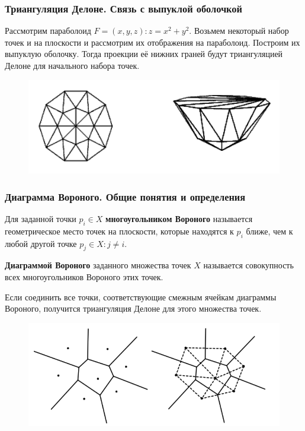 \documentclass[notheorems,aspectratio=169]{beamer}
\begin{document}
\begin{frame}\frametitle{Триангуляция Делоне. Связь с выпуклой оболочкой}
	Рассмотрим параболоид $F = {(x,y,z): z = x^2+y^2}$. Возьмем некоторый набор
	точек и на плоскости и рассмотрим их отображения на параболоид. 
	Построим их выпуклую оболочку. Тогда проекции её нижних граней будут триангуляцией Делоне
	для начального набора точек. 
	\begin{figure}
		\includegraphics[height=0.5\textheight, keepaspectratio]{delone+obol.png}
	\end{figure}
\end{frame}

\begin{frame}\frametitle{Диаграмма Вороного. Общие понятия и определения}
	Для заданной точки $p_i \in X$
	\textbf{многоугольником Вороного} называется геометрическое место точек на плоскости,
	которые находятся к $p_i$ ближе, чем к любой другой точке $p_j \in X: j \neq i$. 
	
	\textbf{Диаграммой Вороного} заданного множества точек $X$ называется совокупность всех 
	многоугольников Вороного этих точек. 
	
	Если соединить все точки, соответствующие смежным ячейкам диаграммы Вороного,
	получится триангуляция Делоне для этого множества точек.
	\begin{figure}
		\includegraphics[height=0.5\textheight, keepaspectratio]{voronoj.png}
	\end{figure}
\end{frame}
\end{document}
